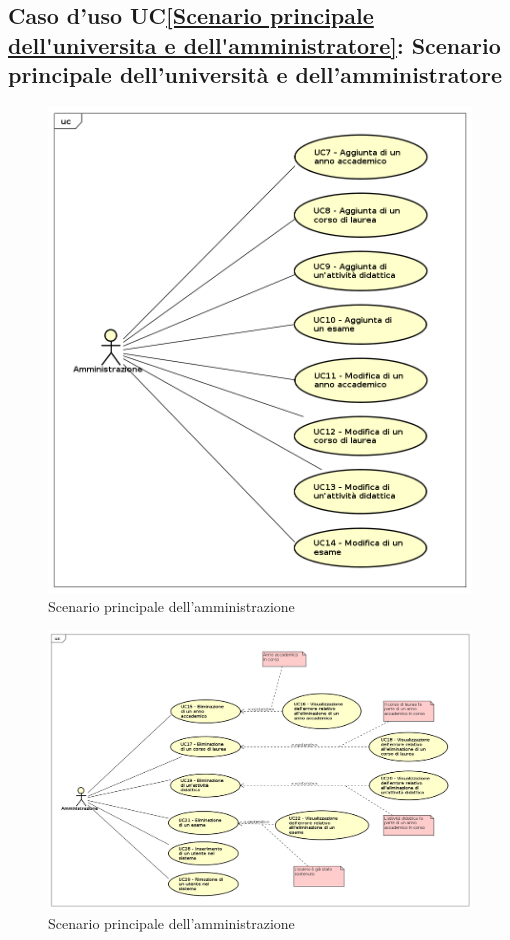 \subsection{Caso d'uso UC\ref{Scenario principale dell'universita e dell'amministratore}: Scenario principale dell'università e dell'amministratore}
\begin{figure} [H]
	\centering
	\includegraphics[scale=0.5]{./img/UseCaseDiagram02A.png}
	\caption{Scenario principale dell'amministrazione }\label{}
\end{figure}
\begin{figure} [H]
	\centering
	\includegraphics[scale=0.4]{./img/UseCaseDiagram02B.png}
	\caption{Scenario principale dell'amministrazione }\label{}
	\end{figure}
